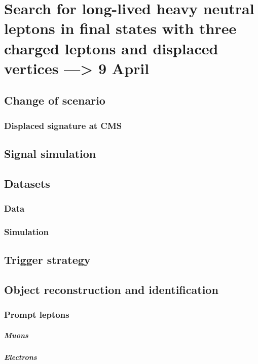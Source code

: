 
\chapter{Search for long-lived heavy neutral leptons in final states
with three charged leptons and displaced vertices  ---> 9 April} %

\label{Chapter6} %

\section{Change of scenario}
\subsection{Displaced signature at CMS}

\section{Signal simulation}
\section{Datasets}
\subsection{Data}
\subsection{Simulation}

\section{Trigger strategy}
\section{Object reconstruction and identification}
\subsection{Prompt leptons}
\paragraph {Muons}
\paragraph {Electrons}
